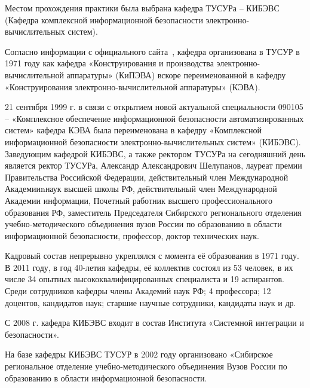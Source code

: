 Местом прохождения практики была выбрана кафедра ТУСУРа – КИБЭВС (Кафедра комплексной информационной безопасности электронно-
вычислительных систем).

Согласно информации с официального сайта~\cite{kibevs}, кафедра организована в ТУСУР в 1971 году как кафедра «Конструирования и производства электронно-вычислительной аппаратуры»
(КиПЭВА) вскоре переименованной в кафедру «Конструирования электронно-вычислительной аппаратуры» (КЭВА). 

21 сентября 1999 г. в связи с открытием новой актуальной специальности 090105 – «Комплексное обеспечение информационной
безопасности автоматизированных систем» кафедра КЭВА была переименована в кафедру «Комплексной информационной безопасности
электронно-вычислительных систем» (КИБЭВС). Заведующим кафедрой КИБЭВС, а также ректором ТУСУРа на сегодняшний день является ректор
ТУСУРа, Александр Александрович Шелупанов, лауреат премии Правительства Российской Федерации, действительный член 
Международной Академииnнаук высшей школы РФ, действительный член Международной Академии информации, 
Почетный работник высшего профессионального образования РФ, заместитель Председателя Сибирского регионального 
отделения учебно-методического объединения вузов России по образованию в области информационной безопасности, профессор, доктор технических наук.

Кадровый состав непрерывно укреплялся с момента её образования в 1971 году. 
В 2011 году, в год 40-летия кафедры, её коллектив состоял из 53 человек, в их числе 34 опытных 
высококвалифицированных специалиста и 19 аспирантов. Среди сотрудников кафедры  члены Академий наук РФ; 4
профессора; 12 доцентов, кандидатов наук; старшие научные сотрудники, кандидаты наук и др.

С 2008 г. кафедра КИБЭВС входит в состав Института «Системной интеграции и безопасности».

На базе кафедры КИБЭВС ТУСУР в 2002 году организовано «Сибирское региональное отделение учебно-методического объединения
Вузов России по образованию в области информационной безопасности.

